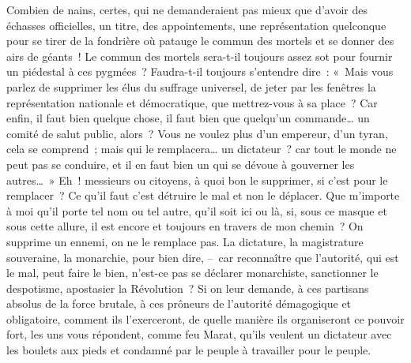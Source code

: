 \documentclass[french,twoside]{book} %
\begin{document}
Combien de nains, certes, qui ne demanderaient pas mieux que d’avoir des échasses officielles, un titre, des appointements, une représentation quelconque pour se tirer de la fondrière où patauge le commun des mortels et se donner des airs de géants ! Le commun des mortels sera-t-il toujours assez sot pour fournir un piédestal à ces pygmées ? Faudra-t-il toujours s’entendre dire : « Mais vous parlez de supprimer les élus du suffrage universel, de jeter par les fenêtres la représentation nationale et démocratique, que mettrez-vous à sa place ? Car enfin, il faut bien quelque chose, il faut bien que quelqu’un commande… un comité de salut public, alors ? Vous ne voulez plus d’un empereur, d’un tyran, cela se comprend ; mais qui le remplacera… un dictateur ? car tout le monde ne peut pas se conduire, et il en faut bien un qui se dévoue à gouverner les autres… » Eh ! messieurs ou citoyens, à quoi bon le supprimer, si c’est pour le remplacer ? Ce qu’il faut c’est détruire le mal et non le déplacer. Que m’importe à moi qu’il porte tel nom ou tel autre, qu’il soit ici ou là, si, sous ce masque et sous cette allure, il est encore et toujours en travers de mon chemin ? On supprime un ennemi, on ne le remplace pas. La dictature, la magistrature souveraine, la monarchie, pour bien dire, – car reconnaître que l’autorité, qui est le mal, peut faire le bien, n’est-ce pas se déclarer monarchiste, sanctionner le despotisme, apostasier la Révolution ? Si on leur demande, à ces partisans absolus de la force brutale, à ces prôneurs de l’autorité démagogique et obligatoire, comment ils l’exerceront, de quelle manière ils organiseront ce pouvoir fort, les uns vous répondent, comme feu Marat, qu’ils veulent un dictateur avec les boulets aux pieds et condamné par le peuple à travailler pour le peuple.\par
\end{document}
